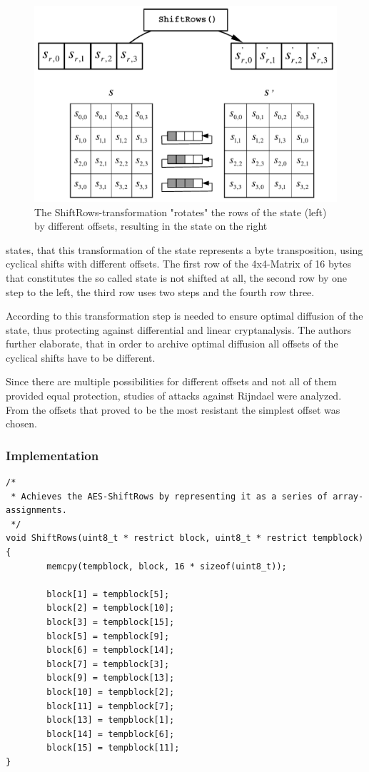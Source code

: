 \begin{figure}
\centering
\includegraphics[scale = 0.3]{data/figures/shiftrows.png}
\caption{The ShiftRows-transformation "rotates" the rows of the state (left) by different offsets, resulting in the state on the right}
\end{figure}

\cite[p. 37]{rijndael} states, that this transformation of the state represents a byte transposition, using
cyclical shifts with different offsets. The first row of the 4x4-Matrix
of 16 bytes that constitutes the so called state is not shifted at all,
the second row by one step to the left, the third row uses two steps and
the fourth row three.

According to \cite{rijndael} this transformation step is needed to ensure
optimal diffusion of the state, thus protecting
against differential and linear cryptanalysis. The authors further
elaborate, that in order to archive optimal diffusion all
offsets of the cyclical shifts have to be different.

Since there are multiple possibilities for different offsets and not all
of them provided equal protection, studies of attacks against Rijndael
were analyzed. From the offsets that proved to be the most resistant the
simplest offset was chosen.

\hypertarget{implementation-3}{%
\subsubsection{Implementation}\label{implementation-3}}

\begin{lstlisting}
/*
 * Achieves the AES-ShiftRows by representing it as a series of array-assignments.
 */
void ShiftRows(uint8_t * restrict block, uint8_t * restrict tempblock)
{
        memcpy(tempblock, block, 16 * sizeof(uint8_t));

        block[1] = tempblock[5];
        block[2] = tempblock[10];
        block[3] = tempblock[15];
        block[5] = tempblock[9];
        block[6] = tempblock[14];
        block[7] = tempblock[3];
        block[9] = tempblock[13];
        block[10] = tempblock[2];
        block[11] = tempblock[7];
        block[13] = tempblock[1];
        block[14] = tempblock[6];
        block[15] = tempblock[11];
}
\end{lstlisting}

